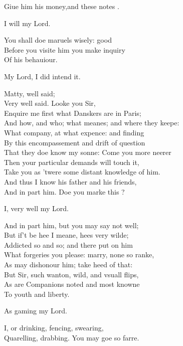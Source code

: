 \documentclass[a5paper,DIV=calc,11pt]{scrbook}
\begin{document}
\begin{drama*}
    \polspeaks Giue him his money,and these notes \reyn.
    
    \reynspeaks I will my Lord.
    
    \polspeaks You shall doe maruels wisely: good \reyn\\
    Before you visite him you make inquiry\\
    Of his behauiour.
    
    \reynspeaks My Lord, I did intend it.
    
    \polspeaks Matty, well said;\\
    Very well said. Looke you Sir,\\
    Enquire me first what Danskers are in Paris;\\
    And how, and who; what meanes; and where they keepe:\\
    What company, at what expence: and finding\\
    By this encompassement and drift of question\\
    That they doe know my sonne: Come you more neerer\\
    Then your particular demands will touch it,\\
    Take you as 'twere some distant knowledge of him.\\
    And thus I know his father and his friends,\\
    And in part him. Doe you marke this \reyn?
    
    \reynspeaks I, very well my Lord.
    
    \polspeaks And in part him, but you may say not well;\\
    But if't be hee I meane, hees very wilde;\\
    Addicted so and so; and there put on him\\
    What forgeries you please: marry, none so ranke,\\
    As may dishonour him; take heed of that:\\
    But Sir, such wanton, wild, and vsuall flips,\\
    As are Companions noted and most knowne\\
    To youth and liberty.
    
    \reynspeaks As gaming my Lord.
    
    \polspeaks I, or drinking, fencing, swearing,\\
    Quarelling, drabbing. You may goe so farre.
    

\end{drama*}
\end{document}

